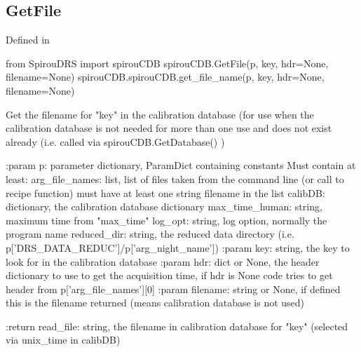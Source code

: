 \noindent\begin{minipage}{\textwidth}
\subsection{GetFile}

Defined in \spirouCDB{}

\begin{pythonbox}
from SpirouDRS import spirouCDB
spirouCDB.GetFile(p, key, hdr=None, filename=None)
spirouCDB.spirouCDB.get_file_name(p, key, hdr=None, filename=None)
\end{pythonbox}

\begin{pythondocstring}
Get the filename for "key" in the calibration database (for use when
the calibration database is not needed for more than one use and does
not exist already (i.e. called via spirouCDB.GetDatabase() )

:param p: parameter dictionary, ParamDict containing constants
    Must contain at least:
            arg_file_names: list, list of files taken from the command line
                            (or call to recipe function) must have at least
                            one string filename in the list
            calibDB: dictionary, the calibration database dictionary
            max_time_human: string, maximum time from "max_time"
            log_opt: string, log option, normally the program name
            reduced_dir: string, the reduced data directory
                         (i.e. p['DRS_DATA_REDUC']/p['arg_night_name'])
:param key: string, the key to look for in the calibration database
:param hdr: dict or None, the header dictionary to use to get the
            acquisition time, if hdr is None code tries to get
            header from p['arg_file_names'][0]
:param filename: string or None, if defined this is the filename returned
                 (means calibration database is not used)

:return read_file: string, the filename in calibration database for
                   "key" (selected via unix_time in calibDB)
\end{pythondocstring}
\end{minipage}

